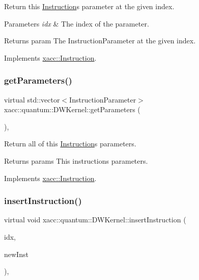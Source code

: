 Return this \hyperlink{a01657}{Instruction}\textquotesingle{}s parameter at the given index.


\begin{DoxyParams}{Parameters}
{\em idx} & The index of the parameter. \\
\hline
\end{DoxyParams}
\begin{DoxyReturn}{Returns}
param The Instruction\+Parameter at the given index. 
\end{DoxyReturn}


Implements \hyperlink{a01657_aa0d9de97a4833a042379647f83c33ab6}{xacc\+::\+Instruction}.

\mbox{\label{a01221_a829462cff34e2257da06afd8a2051a8e}} 
\subsubsection{\texorpdfstring{get\+Parameters()}{getParameters()}}
{\footnotesize\ttfamily virtual std\+::vector$<$Instruction\+Parameter$>$ xacc\+::quantum\+::\+D\+W\+Kernel\+::get\+Parameters (\begin{DoxyParamCaption}{ }\end{DoxyParamCaption})\hspace{0.3cm}{\ttfamily [inline]}, {\ttfamily [virtual]}}

Return all of this \hyperlink{a01657}{Instruction}\textquotesingle{}s parameters.

\begin{DoxyReturn}{Returns}
params This instructions parameters. 
\end{DoxyReturn}


Implements \hyperlink{a01657_aeb67c67713896e8f27a5c7dd531f3340}{xacc\+::\+Instruction}.

\mbox{\label{a01221_a1627af0141f70fc4a3cd500a13fb31b8}} 
\subsubsection{\texorpdfstring{insert\+Instruction()}{insertInstruction()}}
{\footnotesize\ttfamily virtual void xacc\+::quantum\+::\+D\+W\+Kernel\+::insert\+Instruction (\begin{DoxyParamCaption}\item[{const int}]{idx,  }\item[{Inst\+Ptr}]{new\+Inst }\end{DoxyParamCaption})\hspace{0.3cm}{\ttfamily [inline]}, {\ttfamily [virtual]}}

